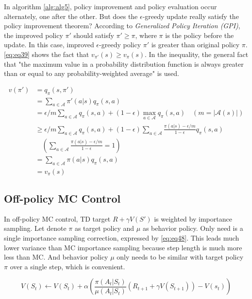 \documentclass[
	10pt, %
]{article}
\theoremstyle{plain}
\newcommand{\mc}[1]{\mathcal{#1}}
\newcommand{\ti}[1]{\textit{#1}}
\numberwithin{equation}{subsection} %
\begin{document}
In algorithm \cref{alg:alg5}, policy improvement and policy evaluation occur alternately, one after the other. 
But does the $\epsilon$-greedy update really satisfy the policy improvement theorem? 
According to \ti{Generalized Policy Iteration (GPI)}, the improved policy $\pi'$ should satisfy $\pi' \geq \pi$, where $\pi$ is the policy before the update. 
In this case, improved $\epsilon$-greedy policy $\pi'$ is greater than original policy $\pi$.
\cref{eq:eq39} shows the fact that $v_{\pi'}(s) \geq v_\pi(s)$.
In the inequality, the general fact that "the maximum value in a probability distribution function is always greater than or equal to any probability-weighted average" is used.

\begin{equation} \label{eq:eq39}
    \begin{aligned}
        v(\pi') &= q_\pi(s, \pi') \\
        &= \sum_{a \in \mc{A}} \pi'(a|s)q_\pi(s,a) \\
        &= \epsilon/m \sum_{a \in \mc{A}} q_\pi(s,a) + (1-\epsilon) \max_{a \in \mc{A}}q_\pi(s,a) \quad (m=|\mc{A}(s)|) \\
        &\geq \epsilon / m \sum_{a \in \mc{A}}q_\pi(s,a) + (1-\epsilon)\sum_{a \in \mc{A}}\frac{\pi(a|s) - \epsilon / m}{1 - \epsilon}q_\pi(s,a)\\ 
        &\quad \left(\sum_{a \in \mc{A}}\frac{\pi(a|s) - \epsilon /m}{1-\epsilon} =1\right)\\
        &= \sum_{a \in \mc{A}}\pi(a|s)q_\pi(s,a) \\
        &= v_\pi(s)
    \end{aligned}
\end{equation}


\subsection{Off-policy MC Control}
In off-policy MC control, TD target $R + \gamma V(S')$ is weighted by importance sampling. 
Let denote $\pi$ as target policy and $\mu$ as behavior policy. 
Only need is a single importance sampling correction, expressed by \cref{eq:eq48}.
This leads much lower variance than MC importance sampling because step length is much more less than MC. And behavior policy $\mu$ only needs to be similar with target policy $\pi$ over a single step, which is convenient. 

\begin{equation} \label{eq:eq48}
    V(S_t) \gets V(S_t) + \alpha \left(\frac{\pi(A_t|S_t)}{\mu(A_t|S_t)}(R_{t+1}+\gamma V(S_{t+1}))-V(s_t)\right)
\end{equation}
\end{document}
